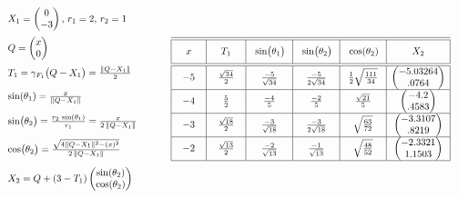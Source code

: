 \documentclass[12pt]{article}
\begin{document}
\[
\begin{array}{ll}
\begin{array}{l}
X_1=\begin{pmatrix} 0 \\ -3 \end{pmatrix},\,r_1=2,\,r_2=1 \\[12pt]
Q=\begin{pmatrix} x \\ 0\end{pmatrix} \\[12pt]
T_1= \gamma_{F_1}\bigl(Q-X_1\bigr)=\frac{\|Q-X_1\|}{2} \\[12pt]
\sin(\theta_1)=\frac{x}{\|Q-X_1\|} \\[12pt]
\sin\bigl(\theta_2\bigr)=\frac{r_2\,\sin(\theta_1)}{r_1}
=\frac{x}{2\,\|Q-X_1\|} \\[12pt]
\cos\bigl(\theta_2\bigr)=\frac{\sqrt{4\|Q-X_1\|^2-(x)^2}}{2\,\|Q-X_1\|} \\[12pt]
X_2=Q+(3-T_1)\begin{pmatrix} \sin(\theta_2) \\ \cos(\theta_2) \end{pmatrix} 
\end{array}
\qquad
&
\begin{array}{|c|c|c|c|c|c|}
\hline\hline
\vphantom{\biggl\{\biggl\}}\hphantom{\quad}x\hphantom{\quad} & \hphantom{\quad}T_1\hphantom{\quad} & \hphantom{\;}\sin\bigl(\theta_1\bigr)\hphantom{\;} & \hphantom{\;}\sin\bigl(\theta_2\bigr)\hphantom{\;} &\hphantom{\;}\cos(\theta_2)\hphantom{\;} & X_2 \\\hline\hline
-5 &\frac{\sqrt{34}}{2} & \frac{-5}{\sqrt{34}
} & \frac{-5}{2\sqrt{34}} & \frac{1}{2}\sqrt{\frac{111}{34}} & \begin{pmatrix} -5.03264 \\ 
.0764\end{pmatrix}   \\[5pt]\hline
-4 & \frac{5}{2}& \frac{-4}{5} & \frac{-2}{5} & 
\frac{\sqrt{21}}{5} & \begin{pmatrix}  -4.2\\ .4583 \end{pmatrix}  \\\hline
-3 & \frac{\sqrt{18}}{2} & \frac{-3}{\sqrt{18}} & \frac{-3}{2\sqrt{18}} & \sqrt{\frac{63}{72}} & \begin{pmatrix}  -3.3107\\ .8219 \end{pmatrix} \\\hline
-2 & \frac{\sqrt{13}}{2} & \frac{-2}{\sqrt{13}} & \frac{-1}{\sqrt{13}} & \sqrt{\frac{48}{52}}& \begin{pmatrix}  -2.3321 \\ 1.1503 \end{pmatrix} \\\hline

\end{array}
\end{array}\]
\end{document}
